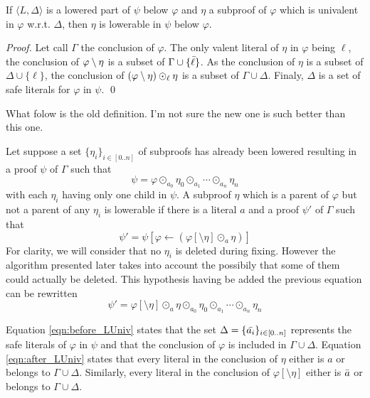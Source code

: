\documentclass{llncs}
\begin{document}
\begin{proposition}
If $\langle L,\Delta \rangle$ is a lowered part of $\psi$ below $\varphi$ and $\eta$ a subproof of
$\varphi$ which is univalent in $\varphi$ w.r.t. $\Delta$, then $\eta$ is lowerable in $\psi$ below $\varphi$.
\end{proposition}

\begin{proof}
Let call $\Gamma$ the conclusion of $\varphi$.  The only valent literal of $\eta$ in $\varphi$ being
$\ell$, the conclusion of $\varphi \setminus \eta$ is a subset of $\Gamma \cup \{\bar{\ell}\}$. As the
conclusion of $\eta$ is a subset of $\Delta \cup \{\ell\}$, the conclusion of $\left(
\varphi \setminus \eta \right) \odot_\ell \eta$ is a subset of $\Gamma \cup \Delta$. Finaly, $\Delta$ is
a set of safe literals for $\varphi$ in $\psi$. \qed
\end{proof}

\begin{jb}
What folow is the old definition. I'm not sure the new one is such better than this one.
\end{jb}

Let suppose a set $\{\eta_i\}_{i \in [0..n]}$ of subproofs has already been lowered resulting in a proof
$\psi$ of $\Gamma$ such that
\begin{equation} \label{eqn:before_LUniv}
  \psi = \varphi \odot_{a_0} \eta_0 \odot_{a_1} \cdots \odot_{a_n} \eta_n
\end{equation}
with each $\eta_i$ having only one child in $\psi$. A subproof $\eta$ which is a parent of $\varphi$ but
not a parent of any $\eta_i$ is lowerable if there is a literal $a$ and a proof $\psi'$ of
$\Gamma$ such that
\begin{equation}
  \psi' = \psi[\varphi \leftarrow (\varphi[\setminus \eta] \odot_a \eta)]
\end{equation}
For clarity, we will consider that no $\eta_i$ is deleted during fixing. However the algorithm
presented later takes into account the possibily that some of them could actually be deleted. This
hypothesis having be added the previous equation can be rewritten
\begin{equation} \label{eqn:after_LUniv}
  \psi' = \varphi[\setminus \eta] \odot_a \eta \odot_{a_0} \eta_0 \odot_{a_1} \cdots \odot_{a_n} \eta_n
\end{equation}

Equation \ref{eqn:before_LUniv} states that the set $\Delta = \{\bar{a_i}\}_{i \in [0..n]}$
represents the safe literals of $\varphi$ in $\psi$ and that the conclusion of $\varphi$ is included
in $\Gamma \cup \Delta$. Equation \ref{eqn:after_LUniv} states that every literal in the conclusion
of $\eta$ either is $a$ or belongs to $\Gamma \cup \Delta$. Similarly, every literal in the
conclusion of $\varphi[\setminus \eta]$ either is $\bar{a}$ or belongs to $\Gamma \cup \Delta$.
\end{document}
